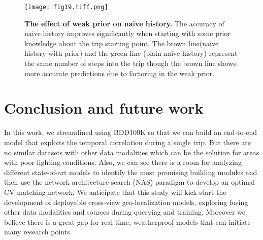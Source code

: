 \documentclass[10pt,letterpaper]{article}
\begin{document}
\begin{figure}[!ht]
  \caption{{\bf The effect of weak prior on naive history.}  The accuracy of naive history improves significantly when starting with some prior knowledge about the trip starting point. The brown line(naive history with prior) and the green line (plain naive history) represent the same number of steps into the trip though the brown line shows more accurate predictions due to factoring in the weak prior.}
  \texttt{[image: fig19.tiff.png]}
  \label{fig19}
\end{figure}

\FloatBarrier

\section*{Conclusion and future work}
In this work, we streamlined using BDD100K so that we can build an end-to-end model that exploits the temporal correlation during a single trip. But there are no similar datasets with other data modalities which can be the solution for areas with poor lighting conditions. Also, we can see there is a room for analyzing different state-of-art models to identify the most promising building modules and then use the network architecture search (NAS) paradigm to develop an optimal CV matching network. We anticipate that this study will kick-start the development of deployable cross-view geo-localization models, exploring fusing other data modalities and sources during querying and training. Moreover we believe there is a great gap for real-time, weatherproof models that can initiate many research points.

\nolinenumbers
\end{document}
